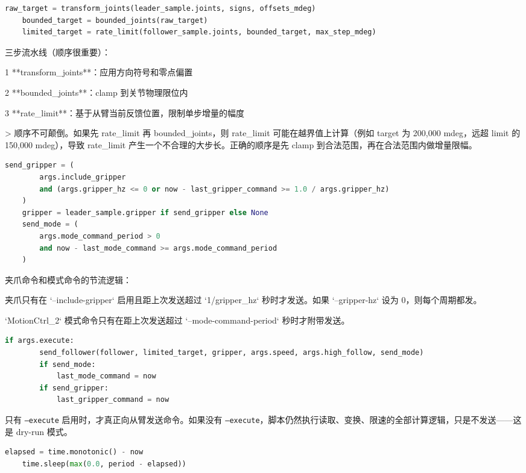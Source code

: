\documentclass[UTF8,a4paper,11pt]{ctexart}
\begin{document}
{\begin{lstlisting}[language=python]
    raw_target = transform_joints(leader_sample.joints, signs, offsets_mdeg)
    bounded_target = bounded_joints(raw_target)
    limited_target = rate_limit(follower_sample.joints, bounded_target, max_step_mdeg)
\end{lstlisting}

三步流水线（顺序很重要）：
\item[1] **transform_joints**：应用方向符号和零点偏置
\item[2] **bounded_joints**：clamp 到关节物理限位内
\item[3] **rate_limit**：基于从臂当前反馈位置，限制单步增量的幅度

> 顺序不可颠倒。如果先 rate_limit 再 bounded_joints，则 rate_limit 可能在越界值上计算（例如 target 为 200,000 mdeg，远超 limit 的 150,000 mdeg），导致 rate_limit 产生一个不合理的大步长。正确的顺序是先 clamp 到合法范围，再在合法范围内做增量限幅。

\begin{lstlisting}[language=python]
    send_gripper = (
        args.include_gripper
        and (args.gripper_hz <= 0 or now - last_gripper_command >= 1.0 / args.gripper_hz)
    )
    gripper = leader_sample.gripper if send_gripper else None
    send_mode = (
        args.mode_command_period > 0
        and now - last_mode_command >= args.mode_command_period
    )
\end{lstlisting}

夹爪命令和模式命令的节流逻辑：
\item 夹爪只有在 `--include-gripper` 启用且距上次发送超过 `1/gripper_hz` 秒时才发送。如果 `--gripper-hz` 设为 0，则每个周期都发。
\item `MotionCtrl_2` 模式命令只有在距上次发送超过 `--mode-command-period` 秒时才附带发送。

\begin{lstlisting}[language=python]
    if args.execute:
        send_follower(follower, limited_target, gripper, args.speed, args.high_follow, send_mode)
        if send_mode:
            last_mode_command = now
        if send_gripper:
            last_gripper_command = now
\end{lstlisting}

只有 \texttt{--execute} 启用时，才真正向从臂发送命令。如果没有 \texttt{--execute}，脚本仍然执行读取、变换、限速的全部计算逻辑，只是不发送——这是 dry-run 模式。

\begin{lstlisting}[language=python]
    elapsed = time.monotonic() - now
    time.sleep(max(0.0, period - elapsed))
\end{lstlisting}

}
\end{document}

